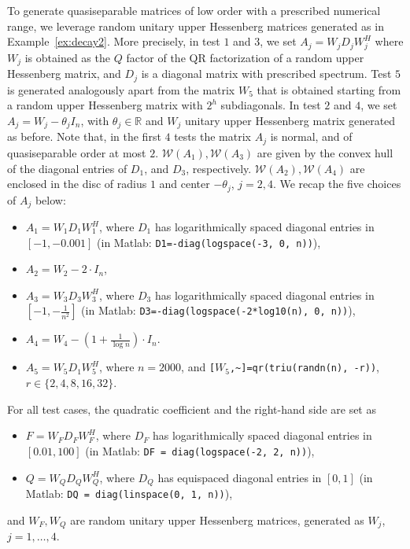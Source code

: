 \documentclass[a4paper,10pt]{article}
\begin{document}
To generate quasiseparable matrices of low order with a prescribed numerical range, we leverage random unitary upper Hessenberg matrices generated as in Example~\ref{ex:decay2}. More precisely, in test $1$ and $3$, we set $A_j= W_jD_jW_j^H$ where $W_j$ is obtained as the $Q$ factor of the QR factorization of a random upper Hessenberg matrix, and $D_j$ is a diagonal matrix with prescribed spectrum. Test $5$ is generated analogously apart from the matrix $W_5$ that is obtained starting from a random upper Hessenberg matrix with $2^h$ subdiagonals. In test $2$ and $4$, we set $A_j=W_j- \theta_j I_n$, with $\theta_j\in\mathbb R$ and $W_j$ unitary upper Hessenberg matrix generated as before. Note that, in the first $4$ tests the matrix  $A_j$ is normal, and of quasiseparable order at most $2$. $\mathcal W(A_1),\mathcal W(A_3)$ are given by the convex hull of the diagonal entries of $D_1$, and $D_3$, respectively. $\mathcal W(A_2),\mathcal W(A_4)$ are enclosed in the disc of radius $1$ and center $-\theta_j$, $j=2,4$. We recap the five choices of $A_j$ below:
\begin{itemize}
	\item $A_1=W_1 D_1 W_1^H$, where $D_1$ has logarithmically spaced diagonal entries in $[-1, -0.001]$ (in Matlab: \texttt{D1=-diag(logspace(-3, 0, n))}), 
	\item $A_2=W_2 - 2 \cdot I_n$, 
	\item $A_3=W_3 D_3 W_3^H$, where $D_3$ has logarithmically spaced diagonal entries in $[-1, -\frac{1}{n^2}]$ (in Matlab: \texttt{D3=-diag(logspace(-2*log10(n), 0, n))}),
	\item $A_4=W_4 - (1 + \frac{1}{\log{n}}) \cdot I_n$.
	\item $A_5=W_5 D_1 W_5^H$, where $n=2000$, and \texttt{[$W_5$,\textasciitilde]=qr(triu(randn(n), -r))}, $r\in \{2,4,8,16,32\}$. 
\end{itemize}
For all test cases, the quadratic coefficient and the right-hand side are set as
\begin{itemize}
	\item $F=W_F D_F W_F^H$, where $D_F$ has logarithmically spaced diagonal entries in $[0.01, 100]$ (in Matlab: \texttt{DF = diag(logspace(-2, 2, n))}),
	\item $Q=W_Q D_Q W_Q^H$, where $D_Q$ has equispaced diagonal entries in $[0, 1]$ (in Matlab: \texttt{DQ = diag(linspace(0, 1, n))}),
\end{itemize}
and $W_F,W_Q$ are random unitary upper Hessenberg matrices, generated as $W_j$, $j=1,\dots,4$. 
\end{document}

